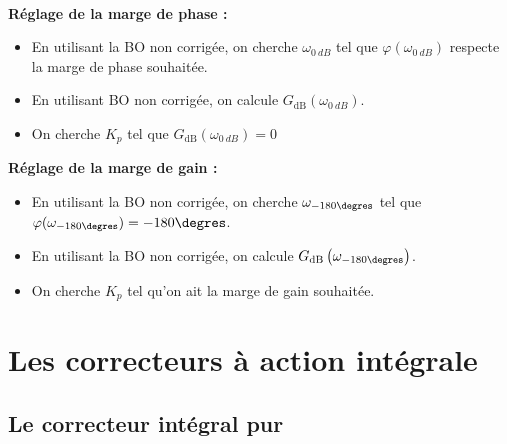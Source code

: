 \documentclass[10pt,fleqn]{article} %
\begin{document}
\begin{methode} ~\\
\vspace{-1cm}
\begin{multicols}{2}
\textbf{Réglage de la marge de phase :}
\begin{itemize}
\item En utilisant la BO non corrigée, on cherche $\omega_{\SI{0}{dB}}$ tel que $\varphi(\omega_{\SI{0}{dB}})$ respecte la marge de phase souhaitée. 
\item En utilisant BO non corrigée, on calcule $G_{\text{dB}}\left(\omega_{\SI{0}{dB}}\right)$. 
\item On cherche $K_p$ tel que $G_{\text{dB}}\left(\omega_{\SI{0}{dB}}\right)=0$
\end{itemize}
\vspace{.25cm}

\vfill

\textbf{Réglage de la marge de gain :}
\begin{itemize}
\item En utilisant la BO non corrigée, on cherche $\omega_{-180\degres}$ tel que $\varphi(\omega_{-180\degres})=-180\degres$.
\item En utilisant la BO non corrigée, on calcule $G_{\text{dB}}\left(\omega_{-180\degres}\right)$. 
\item On cherche $K_p$ tel qu'on ait la marge de gain souhaitée.
\end{itemize}
\end{multicols}
\end{methode}

\newpage

\section{Les correcteurs à action intégrale}
\subsection{Le correcteur intégral pur}
\end{document}
